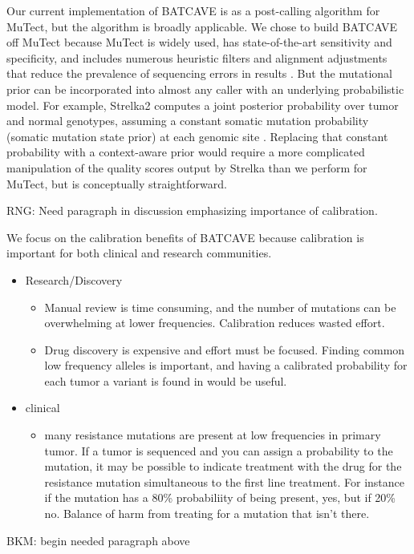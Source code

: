 \documentclass[a4,center,fleqn]{NAR}
\newcommand{\rngcomment}[1]{{\color{red}RNG: #1}}
\newcommand{\bkmcomment}[1]{{\color{blue}BKM: #1}}
\newcommand{\batcave}{BATCAVE\xspace}
\begin{document}

Our current implementation of \batcave is as a post-calling algorithm for MuTect, but the algorithm is broadly applicable.
We chose to build \batcave off MuTect because MuTect is widely used, has state-of-the-art sensitivity and specificity, and includes numerous heuristic filters and alignment adjustments that reduce the prevalence of sequencing errors in results \cite{Cibulskis2013,Griffith2015}.
But the mutational prior can be incorporated into almost any caller with an underlying probabilistic model.
For example, Strelka2 computes a joint posterior probability over tumor and normal genotypes, assuming a constant somatic mutation probability (somatic mutation state prior) at each genomic site \cite{Kim2018}.
Replacing that constant probability with a context-aware prior would require a more complicated manipulation of the quality scores output by Strelka than we perform for MuTect, but is conceptually straightforward.

\rngcomment{Need paragraph in discussion emphasizing importance of calibration.}

We focus on the calibration benefits of \batcave because calibration is important for both clinical and research communities.
\begin{itemize}
  \item Research/Discovery
  \begin{itemize}
    \item Manual review is time consuming, and the number of mutations can be overwhelming at lower frequencies. Calibration reduces wasted effort.
    \item Drug discovery is expensive and effort must be focused. Finding common low frequency alleles is important, and having a calibrated probability for each tumor a variant is found in would be useful.
  \end{itemize}
  \item clinical
  \begin{itemize}
    \item many resistance mutations are present at low frequencies in primary tumor. If a tumor is sequenced and you can assign a probability to the mutation, it may be possible to indicate treatment with the drug for the resistance mutation simultaneous to the first line treatment. For instance if the mutation has a 80\% probabiliity of being present, yes, but if 20\% no. Balance of harm from treating for a mutation that isn't there.
  \end{itemize}

\end{itemize}
\bkmcomment{begin needed paragraph above}
\end{document}
